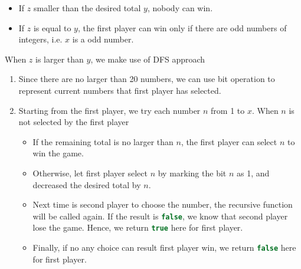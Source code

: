 \begin{itemize}
\item If $z$ smaller than the desired total $y$, nobody can win.
\item If $z$ is equal to $y$, the first player can win only if there are odd numbers of integers, i.e. $x$ is a odd number.
\end{itemize}

When $z$ is larger than $y$, we make use of DFS approach

\begin{enumerate}
\item Since there are no larger than 20 numbers, we can use bit operation to represent current numbers that first player has selected.
\item Starting from the first player, we try each number $n$ from 1 to $x$. When $n$ is not selected by the first player
\begin{itemize}
\item If the remaining total is no larger than $n$, the first player can select $n$ to win the game.
\item Otherwise, let first player select $n$ by marking the bit $n$ as 1, and decreased the desired total by $n$. 
\item Next time is second player to choose the number, the recursive function will be called again. If the result is \lstinline[language=C++, basicstyle=\small\ttfamily, keywordstyle=\bfseries\color{green!40!black}]|false|, we know that second player lose the game. Hence, we return \lstinline[language=C++, basicstyle=\small\ttfamily, keywordstyle=\bfseries\color{green!40!black}]|true| here for first player.
\item Finally, if no any choice can result first player win, we return \lstinline[language=C++, basicstyle=\small\ttfamily, keywordstyle=\bfseries\color{green!40!black}]|false| here for first player.
\end{itemize}
\end{enumerate}


